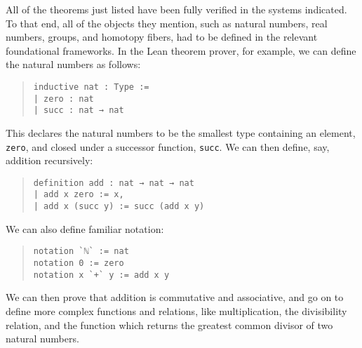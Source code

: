 \documentclass[11pt]{article}
\newcommand{\ttt}[1]{\texttt{#1}}
\begin{document}
All of the theorems just listed have been fully verified in the systems indicated. To that end, all of the objects they mention, such as natural numbers, real numbers, groups, and homotopy fibers, had to be defined in the relevant foundational frameworks. In the Lean theorem prover, for example, we can define the natural numbers as follows:
\begin{quote}\begin{lstlisting}
inductive nat : Type :=
| zero : nat
| succ : nat → nat
\end{lstlisting}\end{quote}
This declares the natural numbers to be the smallest type containing an element, \ttt{zero}, and closed under a successor function, \ttt{succ}. We can then define, say, addition recursively:
\begin{quote}\begin{lstlisting}
definition add : nat → nat → nat
| add x zero := x,
| add x (succ y) := succ (add x y)
\end{lstlisting}\end{quote}
We can also define familiar notation:
\begin{quote}\begin{lstlisting}
notation `ℕ` := nat
notation 0 := zero
notation x `+` y := add x y
\end{lstlisting}\end{quote}
We can then prove that addition is commutative and associative, and go on to define more complex functions and relations, like multiplication, the divisibility relation, and the function which returns the greatest common divisor of two natural numbers. 
\end{document}
